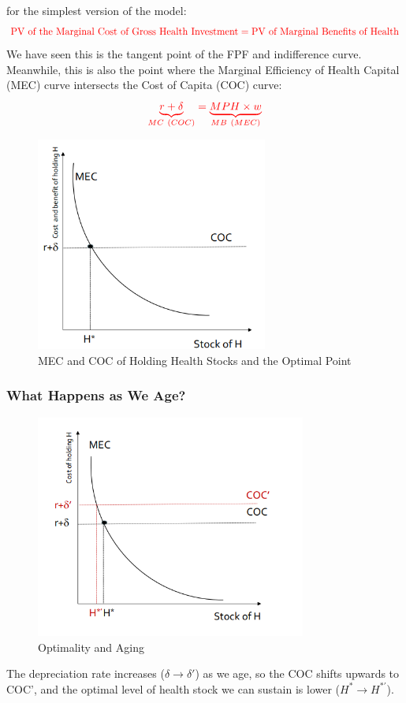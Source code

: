              for the simplest version of the model:
            \begin{equation*}
                \color{red} \text{PV of the Marginal Cost of Gross Health Investment} = \text{PV of Marginal Benefits of Health}
            \end{equation*}
            We have seen this is the tangent point of the FPF and indifference curve. Meanwhile, this is also the point where the Marginal Efficiency of Health Capital (MEC) curve intersects the Cost of Capita (COC) curve:
            \begin{equation*}
                \color{red} \underbrace{r+\delta}_{MC\ (COC)} = \underbrace{MPH \times w}_{MB\ (MEC)}
            \end{equation*}
            \begin{figure}[H]
                \centering
                \includegraphics[width=3in]{images/ch3/25.png}
                \caption{MEC and COC of Holding Health Stocks and the Optimal Point}
            \end{figure}

        \subsubsection{What Happens as We Age?}
            \begin{figure}[H]
                \centering
                \includegraphics[width=3.5in]{images/ch3/26.png}
                \caption{Optimality and Aging}
            \end{figure}
            The depreciation rate increases ($\delta \to \delta'$) as we age, so the COC shifts upwards to COC', and the optimal level of health stock we can sustain is lower ($H^* \to H^{*'}$).

